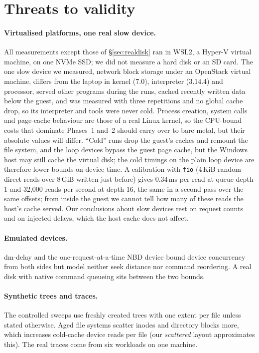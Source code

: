 \section{Threats to validity}
\label{sec:threats}

\paragraph{Virtualised platforms, one real slow device.} All measurements except those
of \S\ref{sec:realdisk} ran in WSL2, a Hyper-V virtual machine, on one NVMe SSD; we did
not measure a hard disk or an SD card. The one slow device we measured, network block
storage under an OpenStack virtual machine, differs from the laptop in kernel (7.0),
interpreter (3.14.4) and processor, served other programs during the runs, cached
recently written data below the guest, and was measured with three repetitions and no
global cache drop, so its interpreter and tools were never cold. Process creation, system
calls and page-cache behaviour are those of a real Linux kernel, so the CPU-bound
costs that dominate Phases~1 and~2 should carry over to bare metal, but their
absolute values will differ. ``Cold'' runs drop the guest's caches and remount the
file system, and the loop devices bypass the guest page cache, but the Windows host
may still cache the virtual disk; the cold timings on the plain loop device are
therefore lower bounds on device time. A calibration with \texttt{fio} (4\,KiB random
direct reads over 8\,GiB written just before) gives 0.34\,ms per read at queue depth 1
and 32{,}000 reads per second at depth 16, the same in a second pass over the same
offsets; from inside the guest we cannot tell how many of these reads the host's cache
served. Our conclusions about slow devices rest on
request counts and on injected delays, which the host cache does not affect.

\paragraph{Emulated devices.} dm-delay and the one-request-at-a-time NBD device bound
device concurrency from both sides but model neither seek distance nor command
reordering. A real disk with native command queueing sits between the two bounds.

\paragraph{Synthetic trees and traces.} The controlled sweeps use freshly created
trees with one extent per file unless stated otherwise. Aged file systems scatter
inodes and directory blocks more, which increases cold-cache device reads per file
(our \emph{scattered} layout approximates this). The real traces come from six
workloads on one machine.


